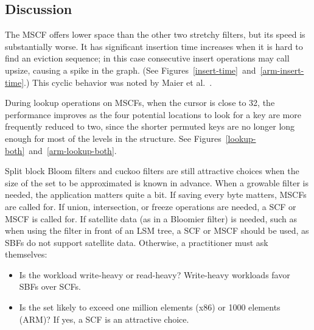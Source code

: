 \documentclass[letterpaper,twocolumn,10pt]{article}
\newcommand{\etal}{et al.}
\newcommand{\taffy}{stretchy}
\newcommand{\TBF}{SBF}
\newcommand{\TCF}{SCF}
\newcommand{\MTCF}{MSCF}
\newcommand{\taffy}{taffy}
\newcommand{\TBF}{TBF}
\newcommand{\TCF}{TCF}
\newcommand{\MTCF}{MTCF}
\begin{document}



\subsection{Discussion}

The \MTCF{} offers lower space than the other two \taffy{} filters, but its speed is substantially worse.
It has significant insertion time increases when it is hard to find an eviction sequence; in this case consecutive insert operations may call upsize, causing a spike in the graph. (See Figures~\ref{insert-time}~and~\ref{arm-insert-time}.)
This cyclic behavior was noted by Maier \etal~\cite{dysect}.

During lookup operations on \MTCF{}s, when the cursor is close to 32, the performance improves as the four potential locations to look for a key are more frequently reduced to two, since the shorter permuted keys are no longer long enough for most of the levels in the structure.
See Figures~\ref{lookup-both}~and~\ref{arm-lookup-both}.

Split block Bloom filters and cuckoo filters are still attractive choices when the size of the set to be approximated is known in advance.
When a growable filter is needed, the application matters quite a bit.
If saving every byte matters, \MTCF{}s are called for.
If union, intersection, or freeze operations are needed, a \TCF{} or \MTCF{} is called for.
If satellite data (as in a Bloomier filter) is needed, such as when using the filter in front of an LSM tree, a \TCF{} or \MTCF{} should be used, as \TBF{}s do not support satellite data.
Otherwise, a practitioner must ask themselves:

\begin{itemize}
\item Is the workload write-heavy or read-heavy?
  Write-heavy workloads favor \TBF{}s over \TCF{}s.
\item Is the set likely to exceed one million elements (x86) or 1000 elements (ARM)?
  If yes, a \TCF{} is an attractive choice.
\end{itemize}
\end{document}
